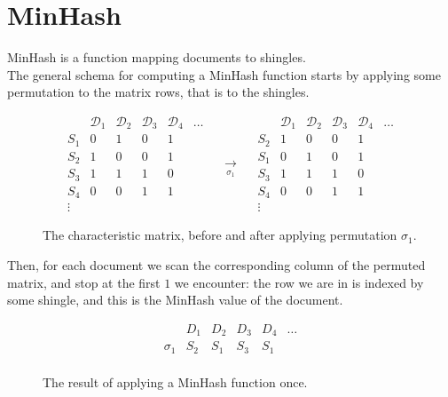 \documentclass{article}
\begin{document}
  \section{MinHash}
  MinHash is a function mapping documents to shingles. \\
  The general schema for computing a MinHash function starts by applying some
  permutation to the matrix rows, that is to the shingles.
  \begin{figure}[H]
    \[
      \begin{array}{l|rrrrr}
        & \mathcal D_1 & \mathcal D_2 & \mathcal D_3 & \mathcal D_4 & \dots \\
        \hline
        S_1 &   0 &   1 &   0 &   1 & \\
        S_2 &   1 &   0 &   0 &   1 & \\
        S_3 &   1 &   1 &   1 &   0 & \\
        S_4 &   0 &   0 &   1 &   1 & \\
        \vdots &     &     &     &     &
      \end{array}
      \quad \underset{ \sigma_1 }{ \longrightarrow } \quad
      \begin{array}{l|rrrrr}
        & \mathcal D_1 & \mathcal D_2 & \mathcal D_3 & \mathcal D_4 & \dots \\
        \hline
        S_2 &   1 &   0 &   0 &   1 & \\
        S_1 &   0 &   1 &   0 &   1 & \\
        S_3 &   1 &   1 &   1 &   0 & \\
        S_4 &   0 &   0 &   1 &   1 & \\
        \vdots &     &     &     &     &
      \end{array}
    \]
    \caption*{
      The characteristic matrix, before and after applying permutation
      \( \sigma_1 \).
    }
  \end{figure}
  Then, for each document we scan the corresponding column of the permuted
  matrix, and stop at the first \( 1 \) we encounter: the row we are in is
  indexed by some shingle, and this is the MinHash value of the document.
  \begin{figure}[H]
    \[
      \begin{array}{l|lllll}
        & D_1 & D_2 & D_3 & D_4 & \dots \\
        \hline
        \sigma_1 & S_2 & S_1 & S_3 & S_1 & \\
      \end{array}
    \]
    \caption*{The result of applying a MinHash function once.}
  \end{figure}
\end{document}

